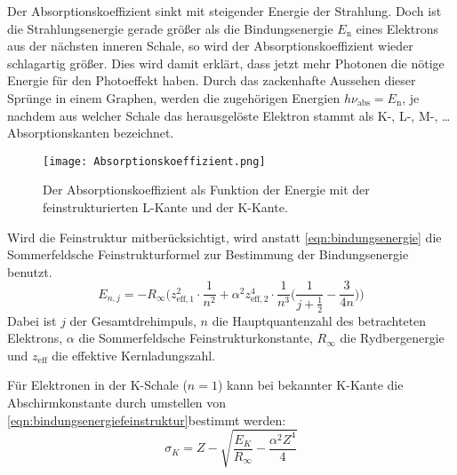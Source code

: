 \documentclass[titlepage = firstcover]{scrartcl}
\begin{document}
        Der Absorptionskoeffizient sinkt mit steigender Energie der Strahlung. Doch ist die Strahlungsenergie gerade größer als die Bindungsenergie $E_\text{n}$ eines Elektrons aus der nächsten inneren Schale, so wird der Absorptionskoeffizient wieder schlagartig größer. Dies wird damit erklärt, dass jetzt mehr Photonen die nötige Energie für den Photoeffekt haben. Durch das zackenhafte Aussehen dieser Sprünge in einem Graphen, werden die zugehörigen Energien $h \nu_\text{abs} = E_\text{n}$, je nachdem aus welcher Schale das herausgelöste Elektron stammt als K-, L-, M-, \dots \, Absorptionskanten bezeichnet.
        \begin{figure}[h]
          \centering
          \texttt{[image: Absorptionskoeffizient.png]}
          \caption{Der Absorptionskoeffizient als Funktion der Energie mit der feinstrukturierten L-Kante und der K-Kante.}
          \label{fig:absorptionskoeffizient}
        \end{figure}
        \FloatBarrier

        Wird die Feinstruktur mitberücksichtigt, wird anstatt \autoref{eqn:bindungsenergie} die Sommerfeldsche Feinstrukturformel zur Bestimmung der Bindungsenergie benutzt.
        \begin{equation}
          E_{n,j} = -R_{\infty} \Biggl(z^2_{\text{eff},1} \cdot \frac{1}{n^2} + \alpha^2 z^4_{\text{eff},2} \cdot \frac{1}{n^3} \Biggl(\frac{1}{j + \frac{1}{2}} - \frac{3}{4 n} \Biggr) \Biggr)
          \label{eqn:bindungsenergiefeinstruktur}
        \end{equation}
        Dabei ist $j$ der Gesamtdrehimpuls, $n$ die Hauptquantenzahl des betrachteten Elektrons, $\alpha$ die Sommerfeldsche Feinstrukturkonstante, $R_{\infty}$ die Rydbergenergie und $z_{\text{eff}}$ die effektive Kernladungszahl.

        Für Elektronen in der K-Schale ($n = 1$) kann bei bekannter K-Kante die Abschirmkonstante durch umstellen von \autoref{eqn:bindungsenergiefeinstruktur}bestimmt werden:
        \begin{equation}
          \sigma_K = Z - \sqrt{\frac{E_K}{R_{\infty}} - \frac{\alpha^2 Z^4}{4}}
          \label{eqn:abschirmkonstate_K}
        \end{equation}
\end{document}
